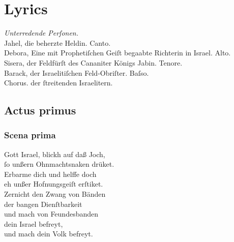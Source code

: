 \documentclass{ees}
\newenvironment{lyrics}[1]{%
  \subsection{#1}\nopagebreak%
  \begin{lyricslist}%
  \let\voice\item%
}{%
  \end{lyricslist}%
}
\begin{document}
\clearscrheadfoot

\chapter{Lyrics}

\textit{Unterredende Perſonen.}\\
Jahel, die beherzte Heldin. Canto.\\
Debora, Eine mit Prophetiſchen Geiſt begaabte Richterin in Israel. Alto. \\
Sisera, der Feldfürſt des Cananiter Königs Jabin. Tenore.\\
Barack, der Israelitiſchen Feld-Obriſter. Baſso.\\
Chorus. der ſtreitenden Israelitern.

\section{Actus primus}

\begin{lyrics}{Scena prima}
  \voice[Chorus der Israeliten]
  Gott Israel, blickh auf daß Joch,\\
  ſo unßern Ohnmachtsnaken drüket.\\
  Erbarme dich und helffe doch\\
  eh unßer Hofnungsgeiſt erſtiket.\\
  Zernicht den Zwang von Bänden\\
  der bangen Dienſtbarkeit\\
  und mach von Feundesbanden\\
  dein Israel befreyt,\\
  und mach dein Volk befreyt.
\end{lyrics}
\end{document}
